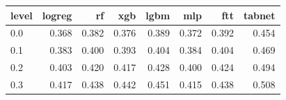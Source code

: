 \begin{tabular}{lrrrrrrr}
\toprule
level & logreg & rf & xgb & lgbm & mlp & ftt & tabnet \\
\midrule
0.0 & 0.368 & 0.382 & 0.376 & 0.389 & 0.372 & 0.392 & 0.454 \\
0.1 & 0.383 & 0.400 & 0.393 & 0.404 & 0.384 & 0.404 & 0.469 \\
0.2 & 0.403 & 0.420 & 0.417 & 0.428 & 0.400 & 0.424 & 0.494 \\
0.3 & 0.417 & 0.438 & 0.442 & 0.451 & 0.415 & 0.438 & 0.508 \\
\bottomrule
\end{tabular}
